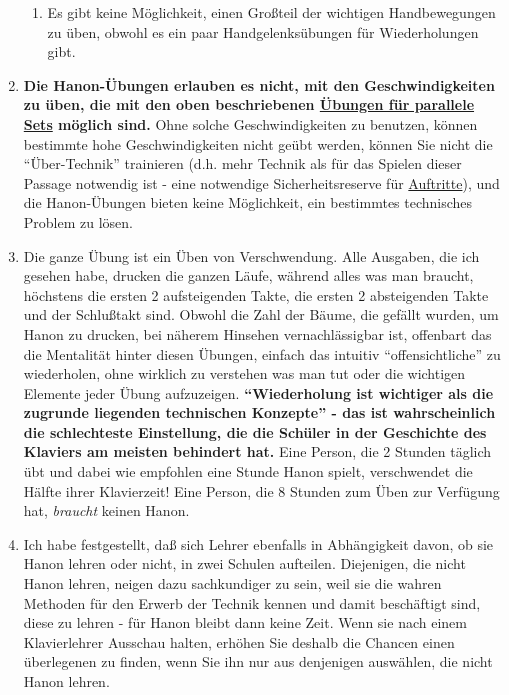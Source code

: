 \begin{enumerate}[label={\roman*.}]
\begin{enumerate}[label={\alph*)}]
\item Es gibt keine Möglichkeit, einen Großteil der wichtigen Handbewegungen zu üben, obwohl es ein paar Handgelenksübungen für Wiederholungen gibt.
\end{enumerate}

\item \label{c1iii7h8}\textbf{Die Hanon-Übungen erlauben es nicht, mit den Geschwindigkeiten zu üben, die mit den oben beschriebenen \hyperref[c1iii7b]{Übungen für parallele Sets} möglich sind.}
Ohne solche Geschwindigkeiten zu benutzen, können bestimmte hohe Geschwindigkeiten nicht geübt werden, können Sie nicht die \enquote{Über-Technik} trainieren (d.h. mehr Technik als für das Spielen dieser Passage notwendig ist - eine notwendige Sicherheitsreserve für \hyperref[c1iii14]{Auftritte}), und die Hanon-Übungen bieten keine Möglichkeit, ein bestimmtes technisches Problem zu lösen.


\item \label{c1iii7h9}Die ganze Übung ist ein Üben von Verschwendung.
Alle Ausgaben, die ich gesehen habe, drucken die ganzen Läufe, während alles was man braucht, höchstens die ersten 2 aufsteigenden Takte, die ersten 2 absteigenden Takte und der Schlußtakt sind.
Obwohl die Zahl der Bäume, die gefällt wurden, um Hanon zu drucken, bei näherem Hinsehen vernachlässigbar ist, offenbart das die Mentalität hinter diesen Übungen, einfach das intuitiv \enquote{offensichtliche} zu wiederholen, ohne wirklich zu verstehen was man tut oder die wichtigen Elemente jeder Übung aufzuzeigen.
\textbf{\enquote{Wiederholung ist wichtiger als die zugrunde liegenden technischen Konzepte} - das ist wahrscheinlich die schlechteste Einstellung, die die Schüler in der Geschichte des Klaviers am meisten behindert hat.}
Eine Person, die 2 Stunden täglich übt und dabei wie empfohlen eine Stunde Hanon spielt, verschwendet die Hälfte ihrer Klavierzeit!
Eine Person, die 8 Stunden zum Üben zur Verfügung hat, \textit{braucht} keinen Hanon.


\item \label{c1iii7h10}Ich habe festgestellt, daß sich Lehrer ebenfalls in Abhängigkeit davon, ob sie Hanon lehren oder nicht, in zwei Schulen aufteilen.
Diejenigen, die nicht Hanon lehren, neigen dazu sachkundiger zu sein, weil sie die wahren Methoden für den Erwerb der Technik kennen und damit beschäftigt sind, diese zu lehren - für Hanon bleibt dann keine Zeit.
Wenn sie nach einem Klavierlehrer Ausschau halten, erhöhen Sie deshalb die Chancen einen überlegenen zu finden, wenn Sie ihn nur aus denjenigen auswählen, die nicht Hanon lehren. 
\end{enumerate}


